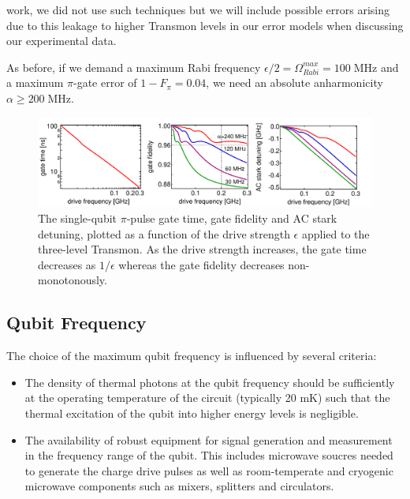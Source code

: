 work, we did not use such techniques but we will  include possible errors arising due to this leakage to higher Transmon levels in our error models when discussing our experimental data.

\smallskip

As before, if we demand a maximum Rabi frequency $\epsilon/2=\Omega_{Rabi}^{max}=100\;\mathrm{MHz}$ and a maximum $\pi$-gate error of $1-F_\pi = 0.04$, we need an absolute anharmonicity $\alpha\ge 200\;\mathrm{MHz}$.

\begin{figure}[htp!]
	\centering
	\includegraphics[width=\textwidth]{"./material/mathematica/three_level_driving_errors"}
	\caption[Single-qubit $\pi$-pulse gate time, gate fidelity and AC stark detuning as a function of drive strength]{The single-qubit $\pi$-pulse gate time, gate fidelity and AC stark detuning, plotted as a function of the drive strength $\epsilon$ applied to the three-level Transmon. As the drive strength increases, the gate time decreases as $1/\epsilon$ whereas the gate fidelity decreases non-monotonously.}
	\label{fig:three_level_driving_errors}
\end{figure}

\subsection{Qubit Frequency}

The choice of the maximum qubit frequency is influenced by several criteria:

\begin{itemize}
\item The density of thermal photons at the qubit frequency should be sufficiently at the operating temperature of the circuit (typically 20 mK) such that the thermal excitation of the qubit into higher energy levels is negligible.
\item The availability of robust equipment for signal generation and measurement in the frequency range of the qubit. This includes microwave soucres needed to generate the charge drive pulses as well as room-temperate and cryogenic microwave components such as mixers, splitters and circulators.
\end{itemize}

